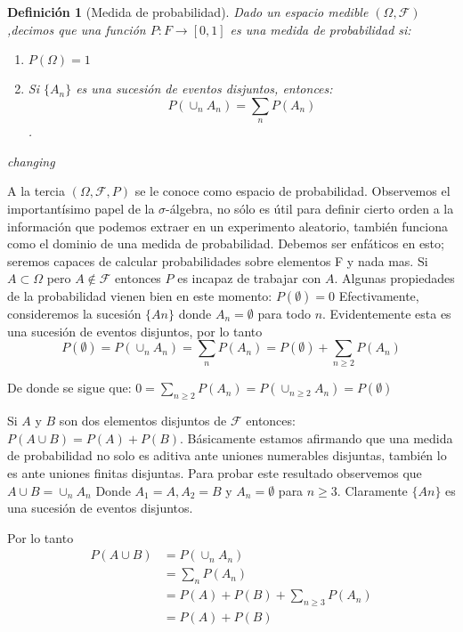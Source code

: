 \documentclass[14pt]{extreport}
\theoremstyle{definicion}
\newtheorem{definition}{Definición}[chapter]
\theoremstyle{propiedad}
\begin{document}
\begin{definition}[Medida de probabilidad]
  Dado un espacio medible $(\Omega, \mathcal{F})$,decimos que una función $P : F \rightarrow [0,1]$ es una medida de probabilidad si:

  \begin{enumerate}
    \item $P(\Omega) = 1$
    \item Si $\{A_n \}$ es una sucesión de eventos disjuntos, entonces:
          $$P\left(\cup_n A_n \right) = \sum_n P(A_n)$$.
  \end{enumerate}changing
\end{definition}

A la tercia $(\Omega, \mathcal{F}, P)$ se le conoce como espacio de probabilidad. Observemos el importantísimo papel de la $\sigma$-álgebra, no sólo es útil para definir cierto orden a la información que podemos extraer en un experimento aleatorio, también funciona como el dominio de una medida de probabilidad. Debemos ser enfáticos en esto; seremos capaces de calcular probabilidades sobre elementos F y nada mas. Si $A \subset \Omega$ pero $A \notin \mathcal{F}$ entonces $P$ es incapaz de trabajar con $A$. Algunas propiedades de la probabilidad vienen bien en este momento: $P(\emptyset) = 0$ Efectivamente, consideremos la sucesión $\{An \}$ donde $A_n = \emptyset$ para todo $n$. Evidentemente esta es una sucesión de eventos disjuntos, por lo tanto
$$
  P(\emptyset) = P\left(\cup_n A_n\right) = \sum_n P(A_n ) = P(\emptyset) + \sum_{n\geq2} P(A_n )
$$

De donde se sigue que: $0 = \sum_{n\geq 2} P(A_n) = P\left(\cup_{n\geq 2} A_n\right) = P(\emptyset)$

Si $A$ y $B$ son dos elementos disjuntos de $\mathcal{F}$ entonces: $P\left(A \cup B\right) = P(A) + P(B)$. Básicamente estamos afirmando que una medida de probabilidad no solo es aditiva ante uniones numerables disjuntas, también lo es ante uniones finitas disjuntas. Para probar este resultado observemos que $A \cup B = \cup_n A_n$ Donde $A_1 = A, A_2 = B$ y $A_n = \emptyset$ para $n \geq 3$. Claramente $\{An \}$ es una sucesión de eventos disjuntos.

Por lo tanto
\begin{equation*}
  \begin{split}
    P(A \cup B) & = P\left(\cup_n A_n \right)\\
    & = \sum_n P(A_n) \\
    & = P(A) + P(B) + \sum_{n\geq 3} P(A_n) \\
    & = P(A) + P(B)
  \end{split}
\end{equation*}
\end{document}
